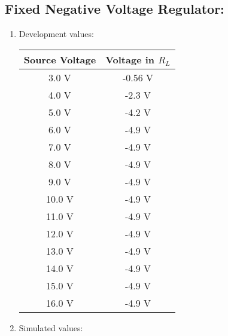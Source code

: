 \subsection{Fixed Negative Voltage Regulator:}

\begin{tasks}

\begin{multicols}{2}

\begin{enumerate}
\item Development values:

\begin{center}
\begin{tabular}[.5cm]{ c c }
\toprule
Source Voltage & Voltage in $R_{L}$ \\
\midrule
3.0 V & -0.56 V \\
\cmidrule{1-2}
4.0 V & -2.3 V \\
\cmidrule{1-2}
5.0 V & -4.2 V \\
\cmidrule{1-2}
6.0 V & -4.9 V \\
\cmidrule{1-2}
7.0 V & -4.9 V \\
\cmidrule{1-2}
8.0 V & -4.9 V \\
\cmidrule{1-2}
9.0 V & -4.9 V \\
\cmidrule{1-2}
10.0 V & -4.9 V \\
\cmidrule{1-2}
11.0 V & -4.9 V \\
\cmidrule{1-2}
12.0 V & -4.9 V \\
\cmidrule{1-2}
13.0 V & -4.9 V \\
\cmidrule{1-2}
14.0 V & -4.9 V \\
\cmidrule{1-2}
15.0 V & -4.9 V \\
\cmidrule{1-2}
16.0 V & -4.9 V \\
\bottomrule
\end{tabular}
\end{center} 

\item Simulated values:


\end{enumerate}
\end{multicols}
\end{tasks}
